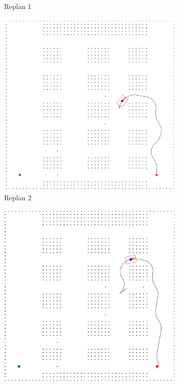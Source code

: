 \documentclass{article}
\begin{document}
\begin{figure}[ht]
\begin{subfigure}[b]{0.3\textwidth}
        \caption{Replan 1}
        \label{fig:map62}
    \end{subfigure}
    \begin{subfigure}[b]{0.3\textwidth}
        \includegraphics[width = \textwidth]{map6plan3_2.png}
        \caption{Replan 2}
        \label{fig:map63}
    \end{subfigure}
    \begin{subfigure}[b]{0.3\textwidth}
        \includegraphics[width = \textwidth]{map6plan3_3.png}

\end{subfigure}
\end{figure}
\end{document}
